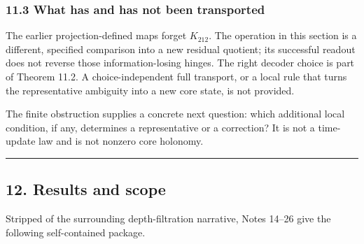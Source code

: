 \documentclass[
  11pt,
  a4paper,
]{article}
\begin{document}
\hypertarget{what-has-and-has-not-been-transported}{%
\subsubsection{11.3 What has and has not been
transported}\label{what-has-and-has-not-been-transported}}

The earlier projection-defined maps forget \(K_{212}\). The operation in
this section is a different, specified comparison into a new residual
quotient; its successful readout does not reverse those
information-losing hinges. The right decoder choice is part of Theorem
11.2. A choice-independent full transport, or a local rule that turns
the representative ambiguity into a new core state, is not provided.

The finite obstruction supplies a concrete next question: which
additional local condition, if any, determines a representative or a
correction? It is not a time-update law and is not nonzero core
holonomy.

\begin{center}\rule{0.5\linewidth}{0.5pt}\end{center}

\hypertarget{results-and-scope}{%
\subsection{12. Results and scope}\label{results-and-scope}}

Stripped of the surrounding depth-filtration narrative, Notes 14--26
give the following self-contained package.
\end{document}
